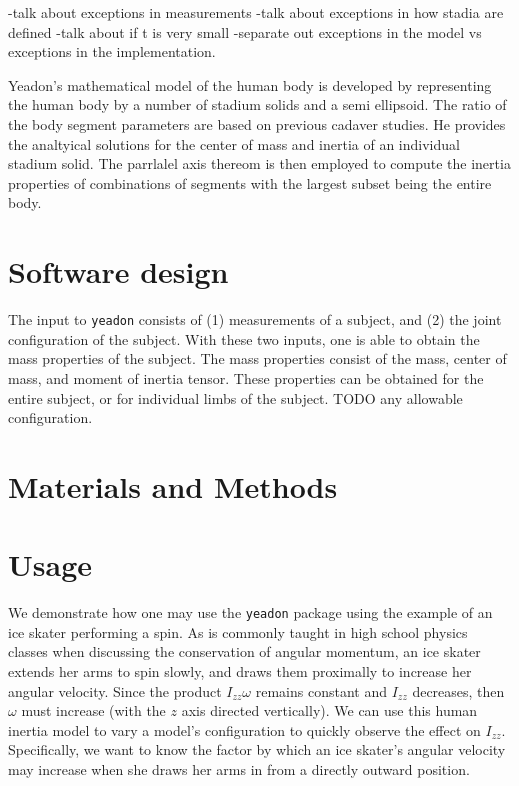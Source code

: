 \documentclass[10pt]{article}
\begin{document}
-talk about exceptions in measurements
-talk about exceptions in how stadia are defined
-talk about if t is very small
-separate out exceptions in the model vs exceptions in the implementation.



Yeadon's mathematical model of the human body is developed by representing the
human body by a number of stadium solids and a semi ellipsoid. The ratio of the
body segment parameters are based on previous cadaver studies. He provides the
analtyical solutions for the center of mass and inertia of an individual
stadium solid. The parrlalel axis thereom is then employed to compute the
inertia properties of combinations of segments with the largest subset being
the entire body.



\section*{Software design}

The input to \verb+yeadon+ consists of (1) measurements of a subject, and (2)
the joint configuration of the subject. With these two inputs, one is able to
obtain the mass properties of the subject.
The mass properties consist of the mass, center of mass, and moment of inertia
tensor. These properties can be obtained for the entire subject, or for
individual limbs of the subject. TODO any allowable configuration.

\section*{Materials and Methods}

\section*{Usage}

We demonstrate how one may use the \verb+yeadon+ package using the example of
an ice skater performing a spin. As is commonly taught in high school physics
classes when discussing the conservation of angular momentum, an ice skater
extends her arms to spin slowly, and draws them proximally to increase her
angular velocity. Since the product $I_{zz}\omega$ remains constant and $I_{zz}$
decreases, then $\omega$ must increase (with the $z$ axis directed vertically).
We can use this human inertia model to vary a model's configuration to quickly
observe the effect on $I_{zz}$. Specifically, we want to know the factor by
which an ice skater's angular velocity may increase when she draws her arms in
from a directly outward position.
\end{document}
